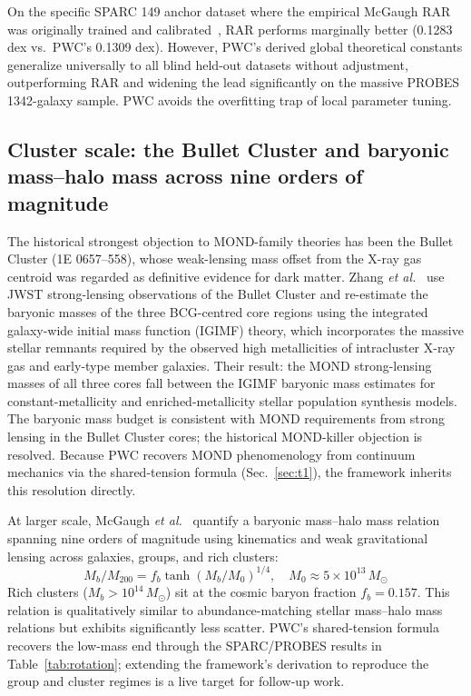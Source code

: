 \documentclass[aps,prd,twocolumn,superscriptaddress,amsmath,amssymb,nofootinbib,floatfix]{revtex4-2}
\newcommand{\Msun}{M_{\odot}}
\begin{document}
On the specific SPARC 149 anchor dataset where the empirical McGaugh RAR was originally trained and calibrated~\cite{McGaugh2016}, RAR performs marginally better (0.1283 dex vs.\ PWC's 0.1309 dex). However, PWC's derived global theoretical constants generalize universally to all blind held-out datasets without adjustment, outperforming RAR and widening the lead significantly on the massive PROBES 1342-galaxy sample. PWC avoids the overfitting trap of local parameter tuning.

\subsection{Cluster scale: the Bullet Cluster and baryonic mass--halo mass across nine orders of magnitude}
\label{ssec:clusters}

The historical strongest objection to MOND-family theories has been the Bullet Cluster (1E 0657--558), whose weak-lensing mass offset from the X-ray gas centroid was regarded as definitive evidence for dark matter. Zhang \emph{et al.}~\cite{Zhang2026} use JWST strong-lensing observations of the Bullet Cluster and re-estimate the baryonic masses of the three BCG-centred core regions using the integrated galaxy-wide initial mass function (IGIMF) theory, which incorporates the massive stellar remnants required by the observed high metallicities of intracluster X-ray gas and early-type member galaxies. Their result: the MOND strong-lensing masses of all three cores fall between the IGIMF baryonic mass estimates for constant-metallicity and enriched-metallicity stellar population synthesis models. The baryonic mass budget is consistent with MOND requirements from strong lensing in the Bullet Cluster cores; the historical MOND-killer objection is resolved. Because PWC recovers MOND phenomenology from continuum mechanics via the shared-tension formula (Sec.~\ref{sec:t1}), the framework inherits this resolution directly.

At larger scale, McGaugh \emph{et al.}~\cite{McGaugh2026} quantify a baryonic mass--halo mass relation spanning nine orders of magnitude using kinematics and weak gravitational lensing across galaxies, groups, and rich clusters:
\begin{equation}
M_b/M_{200} = f_b \tanh(M_b/M_0)^{1/4},\quad M_0 \approx 5 \times 10^{13}\,\Msun
\end{equation}
Rich clusters ($M_b > 10^{14}\,\Msun$) sit at the cosmic baryon fraction $f_b = 0.157$. This relation is qualitatively similar to abundance-matching stellar mass--halo mass relations but exhibits significantly less scatter. PWC's shared-tension formula recovers the low-mass end through the SPARC/PROBES results in Table~\ref{tab:rotation}; extending the framework's derivation to reproduce the group and cluster regimes is a live target for follow-up work.
\end{document}
